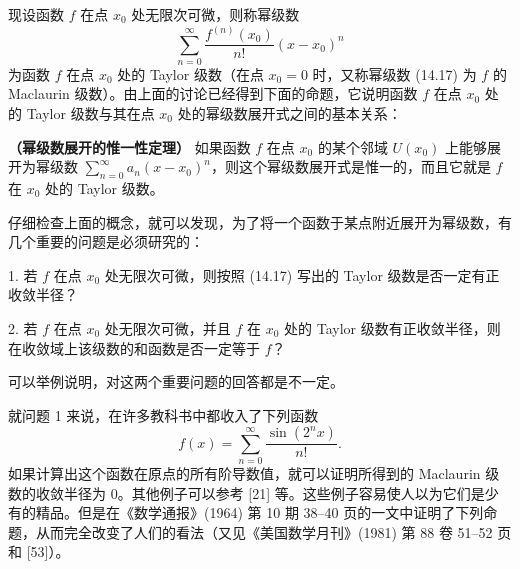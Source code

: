现设函数 $f$ 在点 $x_0$ 处无限次可微，则称幂级数
\begin{equation}
  \sum_{n=0}^{\infty}\frac{f^{(n)}(x_0)}{n!}(x-x_0)^n
  \tag{14.17}
  \label{eq:14.17}
\end{equation}
为函数 $f$ 在点 $x_0$ 处的 Taylor 级数（在点 $x_0=0$ 时，又称幂级数 (14.17) 为 $f$ 的 Maclaurin 级数）。由上面的讨论已经得到下面的命题，它说明函数 $f$ 在点 $x_0$ 处的 Taylor 级数与其在点 $x_0$ 处的幂级数展开式之间的基本关系：

\begin{xproposition}[14.4.1]
\textbf{（幂级数展开的惟一性定理）} 如果函数 $f$ 在点 $x_0$ 的某个邻域 $U(x_0)$ 上能够展开为幂级数 $\displaystyle\sum_{n=0}^{\infty}a_n(x-x_0)^n$，则这个幂级数展开式是惟一的，而且它就是 $f$ 在 $x_0$ 处的 Taylor 级数。
\end{xproposition}

仔细检查上面的概念，就可以发现，为了将一个函数于某点附近展开为幂级数，有几个重要的问题是必须研究的：

1. 若 $f$ 在点 $x_0$ 处无限次可微，则按照 (14.17) 写出的 Taylor 级数是否一定有正收敛半径？

2. 若 $f$ 在点 $x_0$ 处无限次可微，并且 $f$ 在 $x_0$ 处的 Taylor 级数有正收敛半径，则在收敛域上该级数的和函数是否一定等于 $f$？

可以举例说明，对这两个重要问题的回答都是不一定。

就问题 1 来说，在许多教科书中都收入了下列函数
\begin{equation}
  f(x)=\sum_{n=0}^{\infty}\frac{\sin(2^nx)}{n!}.
  \tag{14.18}
  \label{eq:14.18}
\end{equation}
如果计算出这个函数在原点的所有阶导数值，就可以证明所得到的 Maclaurin 级数的收敛半径为 $0$。其他例子可以参考 [21] 等。这些例子容易使人以为它们是少有的精品。但是在《数学通报》(1964) 第 10 期 38--40 页的一文中证明了下列命题，从而完全改变了人们的看法（又见《美国数学月刊》(1981) 第 88 卷 51--52 页和 [53]）。

